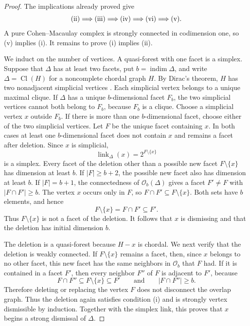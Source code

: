 \documentclass[11pt]{amsart}
\DeclareMathOperator{\indim}{indim}
\DeclareMathOperator{\link}{link}
\DeclareMathOperator{\Cl}{Cl}
\theoremstyle{definition}
\begin{document}
	\begin{proof}
		The implications already proved give
		\[
		\textup{(ii)}\Longrightarrow\textup{(iii)}
		\Longrightarrow\textup{(iv)}
		\Longrightarrow\textup{(vi)}
		\Longrightarrow\textup{(v)}.
		\]
		A pure Cohen--Macaulay complex is strongly connected in codimension one, so (v) implies (i).  It remains to prove (i) implies (ii).
		
		We induct on the number of vertices.  A quasi-forest with one facet is a simplex.  Suppose that $\Delta$ has at least two facets, put $b=\indim\Delta$, and write $\Delta=\Cl(H)$ for a noncomplete chordal graph $H$.  By Dirac's theorem, $H$ has two nonadjacent simplicial vertices \cite{Dirac1961}.  Each simplicial vertex belongs to a unique maximal clique.  If $\Delta$ has a unique $b$-dimensional facet $F_b$, the two simplicial vertices cannot both belong to $F_b$, because $F_b$ is a clique. Choose a simplicial vertex $x$ outside $F_b$.  If there is more than one $b$-dimensional facet, choose either of the two simplicial vertices.  Let $F$ be the unique facet containing $x$.  In both cases at least one $b$-dimensional facet does not contain $x$ and remains a facet after deletion. Since $x$ is simplicial,
		\[
		\link_\Delta(x)=2^{F\setminus\{x\}}
		\]
		is a simplex.  Every facet of the deletion other than a possible new facet $F\setminus\{x\}$ has dimension at least $b$.  If $|F|\geq b+2$, the possible new facet also has dimension at least $b$.  If $|F|=b+1$, the connectedness of $\mathcal O_b(\Delta)$ gives a facet $F'\ne F$ with $|F\cap F'|\geq b$.  The vertex $x$ occurs only in $F$, so $F\cap F'\subseteq F\setminus\{x\}$.  Both sets have $b$ elements, and hence
		\[
		F\setminus\{x\}=F\cap F'\subseteq F'.
		\]
		Thus $F\setminus\{x\}$ is not a facet of the deletion.  It follows that $x$ is dismissing and that the deletion has initial dimension $b$.
		
		The deletion is a quasi-forest because $H-x$ is chordal. We next verify that the deletion is weakly connected. If $F\setminus\{x\}$ remains a facet, then, since $x$ belongs to no other facet, this new facet has the same neighbors in $\mathcal O_b$ that $F$ had.  If it is contained in a facet $F'$, then every neighbor $F''$ of $F$ is adjacent to $F'$, because
		\[
		F\cap F''\subseteq F\setminus\{x\}\subseteq F'
		\qquad\text{and}\qquad |F\cap F''|\geq b.
		\]
		Therefore deleting or replacing the vertex $F$ does not disconnect the overlap graph.  Thus the deletion again satisfies condition (i) and is strongly vertex dismissible by induction.  Together with the simplex link, this proves that $x$ begins a strong dismissal of $\Delta$.
	\end{proof}
	
\end{document}
